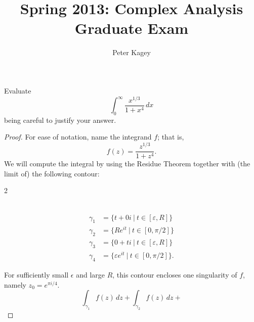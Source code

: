 \documentclass{article}
\newenvironment{problem}[2][Problem]{\begin{trivlist}
\item[\hskip \labelsep {\bfseries #1}\hskip \labelsep {\bfseries #2.}]}{\end{trivlist}}
\begin{document}
\title{Spring 2013: Complex Analysis Graduate Exam}
\author{Peter Kagey}

\maketitle

\begin{problem}{1}
  Evaluate \[
    \int_0^\infty \frac{x^{1/3}}{1 + x^4}\,dx
  \] being careful to justify your answer.
\end{problem}

\begin{proof}
  For ease of notation, name the integrand $f$; that is, \[
    f(z) = \frac{z^{1/3}}{1 + z^4}.
  \]
  We will compute the integral by using the Residue Theorem together with (the
  limit of) the following contour:
  \begin{multicols}{2}
  \\
  \begin{align}
    \gamma_{1} &= \{t + 0i\ |\ t \in [\varepsilon, R] \} \\
    \gamma_{2} &= \{R e^{it}\ |\ t \in [0,\pi/2] \} \\
    \gamma_{3} &= \{0 + ti\ |\ t \in [\varepsilon, R]\} \\
    \gamma_{4} &= \{\varepsilon e^{it}\ |\ t \in [0, \pi/2]\}.
  \end{align}
  \end{multicols}
  For sufficiently small $\epsilon$ and large $R$, this contour encloses one
  singularity of $f$, namely $z_0 = e^{\pi i/4}$.
  \[
    \int_{\gamma_1} f(z)\,dz +
    \int_{\gamma_2} f(z)\,dz +
\]
\end{proof}
\end{document}
